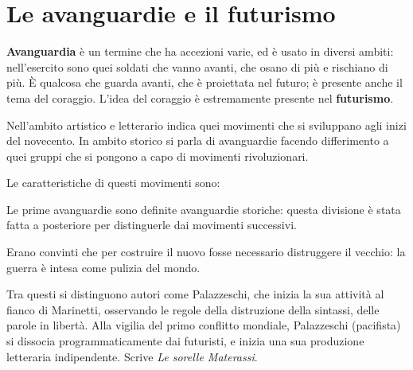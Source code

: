 \chapter{Le avanguardie e il futurismo}

\textbf{Avanguardia} è un termine che ha accezioni varie, ed è usato in diversi ambiti: nell’esercito sono quei soldati che vanno avanti, che osano di più e rischiano di più.
È qualcosa che guarda avanti, che è proiettata nel futuro; è presente anche il tema del coraggio. L’idea del coraggio è estremamente presente nel \textbf{futurismo}.

Nell’ambito artistico e letterario indica quei movimenti che si sviluppano agli inizi del novecento.
In ambito storico si parla di avanguardie facendo differimento a quei gruppi che si pongono a capo di movimenti rivoluzionari.

Le caratteristiche di questi movimenti sono:


Le prime avanguardie sono definite avanguardie storiche: questa divisione è stata fatta a posteriore per distinguerle dai movimenti successivi.

Erano convinti che per costruire il nuovo fosse necessario distruggere il vecchio: la guerra è intesa come pulizia del mondo.

Tra questi si distinguono autori come Palazzeschi, che inizia la sua attività al fianco di Marinetti, osservando le regole della distruzione della sintassi, delle parole in libertà.
Alla vigilia del primo conflitto mondiale, Palazzeschi (pacifista) si dissocia programmaticamente dai futuristi, e inizia una sua produzione letteraria indipendente. Scrive \textit{Le sorelle Materassi}.

